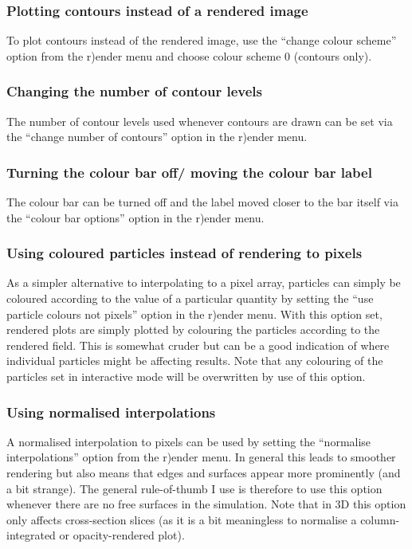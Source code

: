 \documentclass[a4paper,11pt]{article}
\begin{document}
\subsubsection{ Plotting contours instead of a rendered image}
To plot contours instead of the rendered image, use the ``change colour scheme'' option from the r)ender menu and choose colour scheme 0 (contours only). 

\subsubsection{ Changing the number of contour levels}
 The number of contour levels used whenever contours are drawn can be set via the ``change number of contours'' option in the r)ender menu.

\subsubsection{ Turning the colour bar off/ moving the colour bar label}
 The colour bar can be turned off and the label moved closer to the bar itself via the ``colour bar options'' option in the r)ender menu.

\subsubsection{ Using coloured particles instead of rendering to pixels}
\label{sec:colournotrender}
 As a simpler alternative to interpolating to a pixel array, particles can simply be coloured according to the value of a particular quantity by setting the ``use particle colours not pixels'' option in the r)ender menu. With this option set, rendered plots are simply plotted by colouring the particles according to the rendered field. This is somewhat
cruder but can be a good indication of where individual particles might be affecting results.
Note that any colouring of the particles set in interactive mode will be overwritten by use of this option.

\subsubsection{ Using normalised interpolations}
  A normalised interpolation to pixels can be used by setting the ``normalise interpolations'' option from the r)ender menu. In general this leads to smoother rendering but also means that edges and surfaces appear
more prominently (and a bit strange). The general rule-of-thumb I use is therefore to use this option whenever there are no free surfaces in the simulation. Note that in 3D this option only affects cross-section slices (as it is a bit meaningless to normalise a column-integrated or opacity-rendered plot). 
\end{document}
